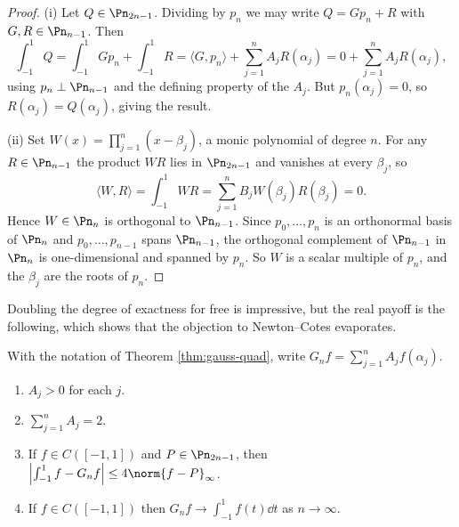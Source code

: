 \begin{proof}
	(i) Let $Q\in\Pn_{2n-1}$. Dividing by $p_n$ we may write $Q = Gp_n + R$ with $G,R\in\Pn_{n-1}$. Then
	$$\int_{-1}^1 Q = \int_{-1}^1 Gp_n + \int_{-1}^1 R = \langle G,p_n\rangle + \sum_{j=1}^n A_jR(\alpha_j) = 0 + \sum_{j=1}^n A_jR(\alpha_j),$$
	using $p_n\perp\Pn_{n-1}$ and the defining property of the $A_j$. But $p_n(\alpha_j)=0$, so $R(\alpha_j) = Q(\alpha_j)$, giving the result.

	(ii) Set $W(x) = \prod_{j=1}^n(x-\beta_j)$, a monic polynomial of degree $n$. For any $R\in\Pn_{n-1}$ the product $WR$ lies in $\Pn_{2n-1}$ and vanishes at every $\beta_j$, so
	$$\langle W,R\rangle = \int_{-1}^1 W R = \sum_{j=1}^n B_jW(\beta_j)R(\beta_j) = 0.$$
	Hence $W \in\Pn_n$ is orthogonal to $\Pn_{n-1}$. Since $p_0,\ldots,p_n$ is an orthonormal basis of $\Pn_n$ and $p_0,\ldots,p_{n-1}$ spans $\Pn_{n-1}$, the orthogonal complement of $\Pn_{n-1}$ in $\Pn_n$ is one-dimensional and spanned by $p_n$. So $W$ is a scalar multiple of $p_n$, and the $\beta_j$ are the roots of $p_n$.
\end{proof}

Doubling the degree of exactness for free is impressive, but the real payoff is the following, which shows that the objection to Newton--Cotes evaporates.

\begin{theorem}\label{thm:gauss-good}
	With the notation of Theorem \ref{thm:gauss-quad}, write $G_nf = \sum_{j=1}^nA_jf(\alpha_j)$.
	\begin{enumerate}[label=(\roman*)]
		\item $A_j > 0$ for each $j$.
		\item $\sum_{j=1}^n A_j = 2$.
		\item If $f \in C([-1,1])$ and $P\in\Pn_{2n-1}$, then $\left|\int_{-1}^1 f - G_nf\right| \leq 4\norm{f-P}_\infty$.
		\item If $f\in C([-1,1])$ then $G_nf \to \int_{-1}^1 f(t)\dd t$ as $n\to\infty$.
	\end{enumerate}
\end{theorem}

